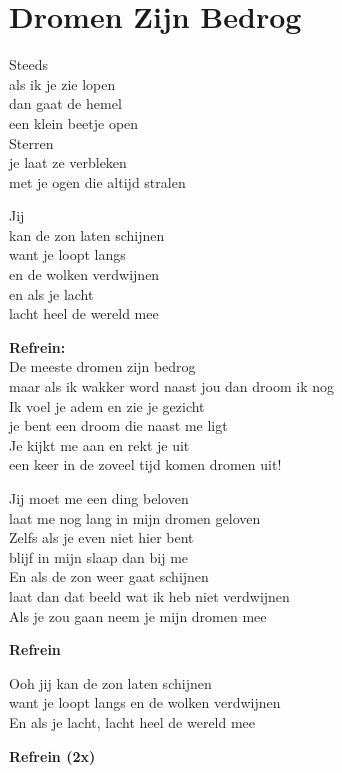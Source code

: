 \section{Dromen Zijn Bedrog}
Steeds\\
als ik je zie lopen\\
dan gaat de hemel\\
een klein beetje open\\
Sterren\\
je laat ze verbleken\\
met je ogen die altijd stralen

Jij\\
kan de zon laten schijnen\\
want je loopt langs\\
en de wolken verdwijnen\\
en als je lacht\\
lacht heel de wereld mee

\textbf{Refrein:}\\
De meeste dromen zijn bedrog\\
maar als ik wakker word naast jou dan droom ik nog\\
Ik voel je adem en zie je gezicht\\
je bent een droom die naast me ligt\\
Je kijkt me aan en rekt je uit\\
een keer in de zoveel tijd komen dromen uit!

Jij moet me een ding beloven\\
laat me nog lang in mijn dromen geloven\\
Zelfs als je even niet hier bent\\
blijf in mijn slaap dan bij me\\
En als de zon weer gaat schijnen\\
laat dan dat beeld wat ik heb niet verdwijnen\\
Als je zou gaan neem je mijn dromen mee

\textbf{Refrein}

Ooh jij kan de zon laten schijnen\\
want je loopt langs en de wolken verdwijnen\\
En als je lacht, lacht heel de wereld mee

\textbf{Refrein (2x)}
